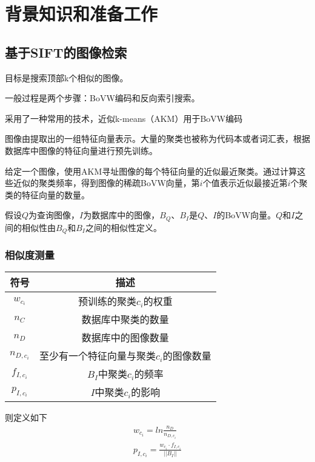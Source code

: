 \documentclass{article}
\begin{document}
\section{背景知识和准备工作}

\subsection{基于SIFT的图像检索}

目标是搜索顶部k个相似的图像。

一般过程是两个步骤：BoVW编码和反向索引搜索。

采用了一种常用的技术，近似k-means（AKM）用于BoVW编码

图像由提取出的一组特征向量表示。大量的聚类也被称为代码本或者词汇表，根据数据库中图像的特征向量进行预先训练。

给定一个图像，使用AKM寻址图像的每个特征向量的近似最近聚类。通过计算这些近似的聚类频率，得到图像的稀疏BoVW向量，第$i$个值表示近似最接近第$i$个聚类的特征向量的数量。

假设$Q$为查询图像，$I$为数据库中的图像，$B_Q$、$B_I$是$Q$、$I$的BoVW向量。$Q$和$I$之间的相似性由$B_Q$和$B_I$之间的相似性定义。

\subsubsection{相似度测量}

\begin{table}[H]
    \centering
    \begin{tabular}[H]{cc}
        \hline 
        符号 & 描述 \\
        \hline 
        $w_{c_i}$ & 预训练的聚类$c_i$的权重 \\
        $n_C$ & 数据库中聚类的数量 \\
        $n_D$ & 数据库中的图像数量 \\
        $n_{D,c_i}$ & 至少有一个特征向量与聚类$c_i$的图像数量\\
        $f_{I,c_i}$ & $B_I$中聚类$c_i$的频率\\
        $p_{I,c_i}$ & $I$中聚类$c_i$的影响\\
        \hline
    \end{tabular}
\end{table}

则定义如下
\begin{gather}
    w_{c_i} = ln \frac{n_D}{n_{D,c_i}} \\
    p_{I,c_i} = \frac{w_{c_i} \cdot f_{I,c_i}}{||B_I||}
\end{gather}
\end{document}
